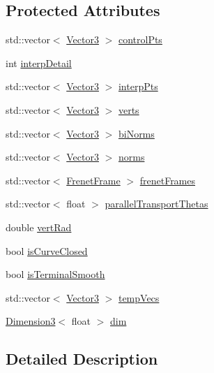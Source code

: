 \subsection*{Protected Attributes}
\begin{DoxyCompactItemize}
\item 
std\-::vector$<$ \hyperlink{class_vector3}{Vector3} $>$ \hyperlink{class_curve3_a2e9e6cfb4a03fffea0b4adbec17bba80}{control\-Pts}
\item 
int \hyperlink{class_curve3_a5ab0207ec14b339175e0aa9d621d70a7}{interp\-Detail}
\item 
std\-::vector$<$ \hyperlink{class_vector3}{Vector3} $>$ \hyperlink{class_curve3_a8060ece4544b6c09dfad0ab3b27af00f}{interp\-Pts}
\item 
std\-::vector$<$ \hyperlink{class_vector3}{Vector3} $>$ \hyperlink{class_curve3_a9937ea75c1a2467d1dc61605c5b958c8}{verts}
\item 
std\-::vector$<$ \hyperlink{class_vector3}{Vector3} $>$ \hyperlink{class_curve3_a32046ec84335f78317dab2dccbeb732e}{bi\-Norms}
\item 
std\-::vector$<$ \hyperlink{class_vector3}{Vector3} $>$ \hyperlink{class_curve3_a9464b3b2baa1a520c5cda6ea19147e71}{norms}
\item 
std\-::vector$<$ \hyperlink{class_frenet_frame}{Frenet\-Frame} $>$ \hyperlink{class_curve3_a6dbfbfd7fd486988ca2d08ddd65b7f68}{frenet\-Frames}
\item 
std\-::vector$<$ float $>$ \hyperlink{class_curve3_aa3c9c1b951d6d8d280a00659ced8a503}{parallel\-Transport\-Thetas}
\item 
double \hyperlink{class_curve3_a404b74eb4ad6ac9796b766ff1a36d823}{vert\-Rad}
\item 
bool \hyperlink{class_curve3_a94b01af1a451e35dbcec9ef36c4b4a64}{is\-Curve\-Closed}
\item 
bool \hyperlink{class_curve3_af842d273f3cdbb907f66ffed7b72d2a5}{is\-Terminal\-Smooth}
\item 
std\-::vector$<$ \hyperlink{class_vector3}{Vector3} $>$ \hyperlink{class_curve3_a527d3cb7d51e3896b93cf048920345f2}{temp\-Vecs}
\item 
\hyperlink{class_dimension3}{Dimension3}$<$ float $>$ \hyperlink{class_curve3_ad2c2f60f7e9c11e87353cb9e6653f1e1}{dim}
\end{DoxyCompactItemize}


\subsection{Detailed Description}


